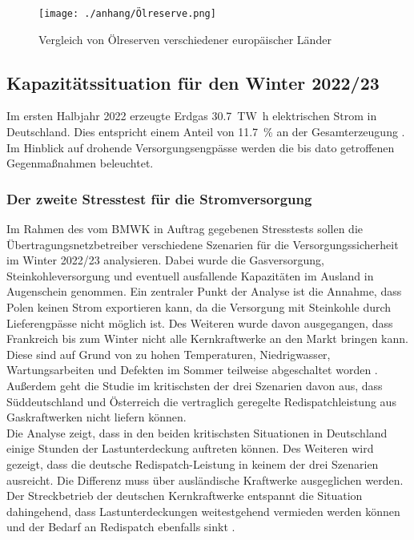 			\begin{figure}[H]
				\centering
				\texttt{[image: ./anhang/Ölreserve.png]}
				\caption{Vergleich von Ölreserven verschiedener europäischer Länder \cite{IEA_Ölreserven}}
				\label{Abb. Strategische Ölreserve} 
			\end{figure}
		
		
	\subsection{Kapazitätssituation für den Winter 2022/23}
	
		Im ersten Halbjahr 2022 erzeugte Erdgas \SI{30,7}{\tera\watt\hour} elektrischen Strom in Deutschland. 
		Dies entspricht einem Anteil von \SI{11,7}{\percent} an der Gesamterzeugung \cite{Stromproduktion_Erdgas}. 
		Im Hinblick auf drohende Versorgungsengpässe werden die bis dato getroffenen Gegenmaßnahmen beleuchtet. 
	
		\subsubsection{Der zweite Stresstest für die Stromversorgung}
		
			Im Rahmen des vom BMWK in Auftrag gegebenen Stresstests sollen die Übertragungsnetzbetreiber verschiedene Szenarien für die Versorgungssicherheit im Winter 2022/23 analysieren. 
			Dabei wurde die Gasversorgung, Steinkohleversorgung und eventuell ausfallende Kapazitäten im Ausland in Augenschein genommen.		
			Ein zentraler Punkt der Analyse ist die Annahme, dass Polen keinen Strom exportieren kann, da die Versorgung mit Steinkohle durch Lieferengpässe nicht möglich ist.
			Des Weiteren wurde davon ausgegangen, dass Frankreich bis zum Winter nicht alle Kernkraftwerke an den Markt bringen kann. 
			Diese sind auf Grund von zu hohen Temperaturen, Niedrigwasser, Wartungsarbeiten und Defekten im Sommer teilweise abgeschaltet worden \cite{AKW_Frankreich}. 
			Außerdem geht die Studie im kritischsten der drei Szenarien davon aus, dass Süddeutschland und Österreich die vertraglich geregelte Redispatchleistung aus Gaskraftwerken nicht liefern können. \\
			
			Die Analyse zeigt, dass in den beiden kritischsten Situationen in Deutschland einige Stunden der Lastunterdeckung auftreten können. 
			Des Weiteren wird gezeigt, dass die deutsche Redispatch-Leistung in keinem der drei Szenarien ausreicht. 
			Die Differenz muss über ausländische Kraftwerke ausgeglichen werden. 
			Der Streckbetrieb der deutschen Kernkraftwerke entspannt die Situation dahingehend, dass Lastunterdeckungen weitestgehend vermieden werden können und der Bedarf an Redispatch ebenfalls sinkt \cite{Stresstest}. \\
			
